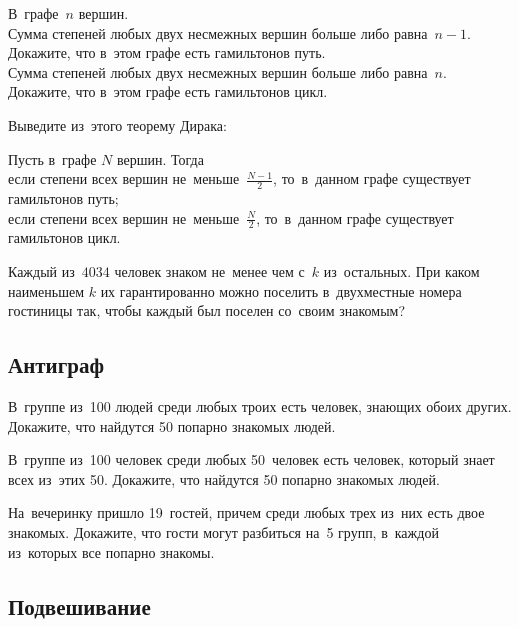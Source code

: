 \begin{problems}

\item{}
В~графе~$n$ вершин.
\\
\subproblem
Сумма степеней любых двух несмежных вершин больше либо равна~$n - 1$.
Докажите, что в~этом графе есть гамильтонов путь.
\\
\subproblem
Сумма степеней любых двух несмежных вершин больше либо равна~$n$.
Докажите, что в~этом графе есть гамильтонов цикл.

Выведите из~этого теорему Дирака:

\resetsubproblem
{}
Пусть в~графе $N$ вершин.
Тогда
\\
\subproblem
если степени всех вершин не~меньше~$\frac{N - 1}{2}$, то~в~данном графе
существует гамильтонов путь;
\\
\subproblem
если степени всех вершин не~меньше~$\frac{N}{2}$, то~в~данном графе существует
гамильтонов цикл.

\item
Каждый из~$4034$ человек знаком не~менее чем с~$k$ из~остальных.
При каком наименьшем $k$ их гарантированно можно поселить в~двухместные номера
гостиницы так, чтобы каждый был поселен со~своим знакомым?

\end{problems}


\subsection*{Антиграф}

\begin{problems}

\item
В~группе из~100 людей среди любых троих есть человек, знающих обоих других.
Докажите, что найдутся 50 попарно знакомых людей.

\item
В~группе из~100 человек среди любых 50~человек есть человек, который знает
всех из~этих 50.
Докажите, что найдутся 50 попарно знакомых людей.

\item
На~вечеринку пришло 19~гостей, причем среди любых трех из~них есть двое
знакомых.
Докажите, что гости могут разбиться на~5 групп, в~каждой из~которых все попарно
знакомы.

\end{problems}


\subsection*{Подвешивание}

